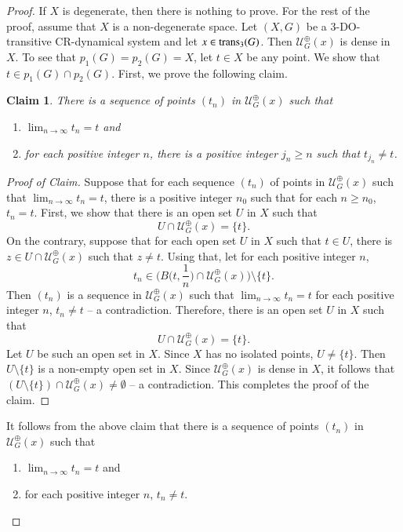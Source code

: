 \documentclass[a4paper,12pt]{article} %
\newcommand{\orbitt}{\mathcal{U}^{\oplus}}
\newcommand{\trans}{\textup{trans}}
\newtheorem*{nonumclaim}{Claim}
\begin{document}
\begin{proof}
If $X$ is degenerate, then there is nothing to prove.  For the rest of the proof, assume that $X$ is a non-degenerate space.
Let $(X,G)$ be a 3-DO-transitive CR-dynamical system and let $x\in \trans_3(G)$. Then $\orbitt_G(x)$ is dense in $X$.  To see that $p_1(G)=p_2(G)=X$, let $t\in X$ be any point.  We show that $t\in p_1(G)\cap p_2(G)$.  First, we prove the following claim.
\begin{nonumclaim}
There is a sequence  of points $(t_n)$ in $\orbitt_G(x)$ such that
\begin{enumerate}
\item $\displaystyle \lim_{n\to \infty}t_n=t$ and 
\item for each positive integer $n$, there is a positive integer $j_n\geq n$ such that $t_{j_n}\neq t$.
\end{enumerate} 
\end{nonumclaim}
\begin{proof}[Proof of Claim]\renewcommand{\qed}{} 
Suppose that for each sequence $(t_n)$ of points in $\orbitt_G(x)$ such that $\displaystyle \lim_{n\to \infty}t_n=t$, there is a positive integer $n_0$ such that for each $n\geq n_0$, $t_n=t$.  First, we show that there is an open set $U$ in $X$ such that 
$$
U\cap \orbitt_G(x)=\{t\}.
$$ 
On the contrary, suppose that for each open set $U$ in $X$ such that $t\in U$,  there is $z\in  U\cap \orbitt_G(x)$ such that $z\neq t$.  Using that, let for each positive integer $n$,  
$$
t_n\in \Big(B\Big(t,\frac{1}{n}\Big)\cap \orbitt_G(x)\Big)\setminus\{t\}. 
$$
Then $(t_n)$ is a sequence in $\orbitt_G(x)$ such that $\displaystyle \lim_{n\to \infty}t_n=t$ for each positive integer $n$,  $t_{n}\neq t$ -- a contradiction.  Therefore,  there is an open set $U$ in $X$ such that 
$$
U\cap \orbitt_G(x)=\{t\}.
$$ 
Let $U$ be such an open set in $X$. Since $X$ has no isolated points, $U\neq \{t\}$.  
Then $U\setminus \{t\}$ is a non-empty open set in $X$. Since $\orbitt_G(x)$ is dense in $X$, it follows that $(U\setminus \{t\})\cap \orbitt_G(x)\neq \emptyset$ -- a contradiction.
This completes the proof of the claim.
\end{proof}
It follows from the above claim that there is a sequence  of points $(t_n)$ in $\orbitt_G(x)$ such that
\begin{enumerate}
\item $\displaystyle \lim_{n\to \infty}t_n=t$ and 
\item for each positive integer $n$,  $t_{n}\neq t$.
\end{enumerate} 

\end{proof}
\end{document}
